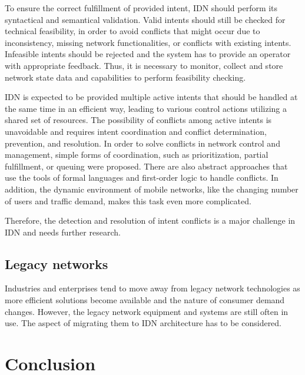 To ensure the correct fulfillment of provided intent, IDN should perform its syntactical and semantical validation. Valid intents should still be checked for technical feasibility, in order to avoid conflicts that might occur due to inconsistency, missing network functionalities, or conflicts with existing intents. Infeasible intents should be rejected and the system has to provide an operator with appropriate feedback. Thus, it is necessary to monitor, collect and store network state data and capabilities to perform feasibility checking.

IDN is expected to be provided multiple active intents that should be handled at the same time in an efficient way, leading to various control actions utilizing a shared set of resources. The possibility of conflicts among active intents is unavoidable and requires intent coordination and conflict determination, prevention, and resolution. In order to solve conflicts in network control and management, simple forms of coordination, such as prioritization, partial fulfillment, or queuing were proposed. There are also abstract approaches that use the tools of formal languages and first-order logic to handle conflicts. In addition, the dynamic environment of mobile networks, like the changing number of users and traffic demand, makes this task even more complicated.\cite{Mwanje2021}

Therefore, the detection and resolution of intent conflicts is a major challenge in IDN and needs further research.


\subsection{Legacy networks}
Industries and enterprises tend to move away from legacy network technologies as more efficient solutions become available and the nature of consumer demand changes. However, the legacy network equipment and systems are still often in use. The aspect of migrating them to IDN architecture has to be considered.\cite{Saha2018}



\section{Conclusion}
\label{sec:Conclusion}





